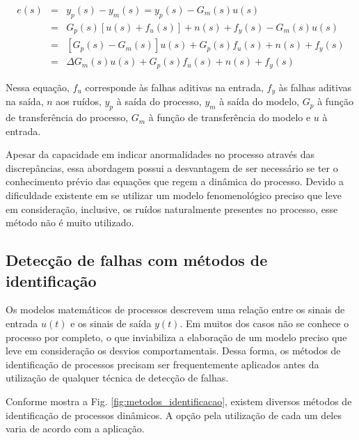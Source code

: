 \begin{eqnarray}\label{eq:residuos}
e(s) & = & y_p(s) - y_m(s) = y_p(s) - G_m(s)u(s)\nonumber\\
& = & G_p(s)\left[u(s) + f_u(s)\right] + n(s) + f_y(s) - G_m(s)u(s)\nonumber\\
& = & \left[G_p(s) - G_m(s)\right]u(s) + G_p(s)f_u(s) + n(s) + f_y(s)\nonumber\\
& = & \Delta G_m(s) u(s) + G_p(s)f_u(s) + n(s) + f_y(s)
\end{eqnarray}

Nessa equação, $f_u$ corresponde às falhas aditivas na entrada, $f_y$ às falhas
aditivas na saída, $n$ aos ruídos, $y_p$ à saída do processo, $y_m$ à saída do
modelo, $G_p$ à função de transferência do processo, $G_m$ à função de
transferência do modelo e $u$ à entrada.


Apesar da capacidade em indicar anormalidades no processo através das
discrepâncias, essa abordagem possui a desvantagem de ser necessário se ter o
conhecimento prévio das equações que regem a dinâmica do processo. Devido a
dificuldade existente em se utilizar um modelo fenomenológico preciso que leve
em consideração, inclusive, os ruídos naturalmente presentes no processo, esse
método não é muito utilizado.

\subsection{Detecção de falhas com métodos de identificação}
Os modelos matemáticos de processos descrevem uma relação entre os sinais de
entrada $u(t)$ e os sinais de saída $y(t)$. Em muitos dos casos não se conhece o
processo por completo, o que inviabiliza a elaboração de um modelo preciso que
leve em consideração os desvios comportamentais. Dessa forma, os métodos de
identificação de processos precisam ser frequentemente aplicados antes da
utilização de qualquer técnica de detecção de falhas.

Conforme mostra a Fig. \ref{fig:metodos_identificacao}, existem diversos métodos
de identificação de processos dinâmicos. A opção pela utilização de cada um
deles varia de acordo com a aplicação.

